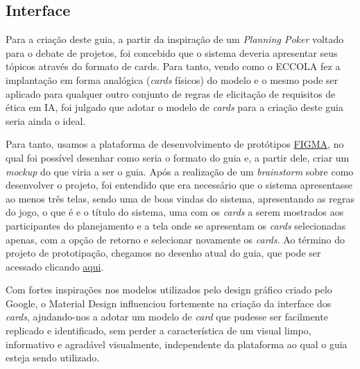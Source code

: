 \subsection{Interface}

Para a criação deste guia, a partir da inspiração de um \textit{Planning Poker} voltado para o debate de projetos, foi concebido que o sistema deveria apresentar seus tópicos através do formato de cards. Para tanto, vendo como o ECCOLA \cite{ECCOLA} fez a implantação em forma analógica (\textit{cards} físicos) do modelo e o mesmo pode ser aplicado para qualquer outro conjunto de regras de elicitação de requisitos de ética em \acrshort{IA}, foi julgado que adotar o modelo de \textit{cards} para a criação deste guia seria ainda o ideal.

Para tanto, usamos a plataforma de desenvolvimento de protótipos \href{https://www.figma.com/}{FIGMA}, no qual foi possível desenhar como seria o formato do guia e, a partir dele, criar um \textit{mockup} do que viria a ser o guia. Após a realização de um \textit{brainstorm} sobre como desenvolver o projeto, foi entendido que era necessário que o sistema apresentasse ao menos três telas, sendo uma de boas vindas do sistema, apresentando as regras do jogo, o que é e o título do sistema, uma com os \textit{cards} a serem mostrados aos participantes do planejamento e a tela onde se apresentam os \textit{cards} selecionadas apenas, com a opção de retorno e selecionar novamente os \textit{cards}. Ao término do projeto de prototipação, chegamos no desenho atual do guia, que pode ser acessado clicando \href{https://www.figma.com/file/zW8ISzBYMcIZFk6BoXZD4n/Eccola}{aqui}.

Com fortes inspirações nos modelos utilizados pelo design gráfico criado pelo Google, o Material Design influenciou fortemente na criação da interface dos \textit{cards}, ajudando-nos a adotar um modelo de \textit{card} que pudesse ser facilmente replicado e identificado, sem perder a característica de um visual limpo, informativo e agradável visualmente, independente da plataforma ao qual o guia esteja sendo utilizado. 

